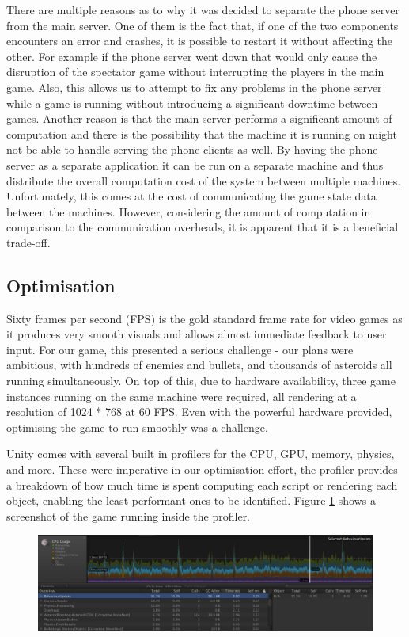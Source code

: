 \documentclass[a4paper,11pt]{article}
\begin{document}
There are multiple reasons as to why it was decided to separate the phone server from the main server. One of them is the fact that, if one of the two components encounters an error and crashes, it is possible to restart it without affecting the other. For example if the phone server went down that would only cause the disruption of the spectator game without interrupting the players in the main game. Also, this allows us to attempt to fix any problems in the phone server while a game is running without introducing a significant downtime between games. Another reason is that the main server performs a significant amount of computation and there is the possibility that the machine it is running on might not be able to handle serving the phone clients as well. By having the phone server as a separate application it can be run on a separate machine and thus distribute the overall computation cost of the system between multiple machines. Unfortunately, this comes at the cost of communicating the game state data between the machines. However, considering the amount of computation in comparison to the communication overheads, it is apparent that it is a beneficial trade-off.

\subsection{Optimisation}
Sixty frames per second (FPS) is the gold standard frame rate for video games as it produces very smooth visuals and allows almost immediate feedback to user input. For our game, this presented a serious challenge - our plans were ambitious, with hundreds of enemies and bullets, and thousands of asteroids all running simultaneously. On top of this, due to hardware availability, three game instances running on the same machine were required, all rendering at a resolution of 1024 * 768 at 60 FPS. Even with the powerful hardware provided, optimising the game to run smoothly was a challenge.

Unity comes with several built in profilers for the CPU, GPU, memory, physics, and more. These were imperative in our optimisation effort, the profiler provides a breakdown of how much time is spent computing each script or rendering each object, enabling the least performant ones to be identified. Figure \ref{fig:profiler} shows a screenshot of the game running inside the profiler.

\begin{figure}[ht]
	\centering
	\includegraphics[width=\textwidth]{images/profiler}
    \label{fig:profiler}
\end{figure}
\end{document}
